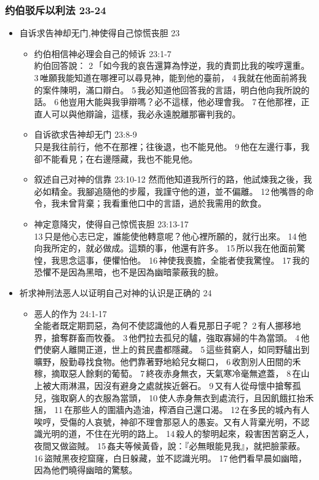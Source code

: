 \subsubsection{约伯驳斥以利法 23-24}
\begin{itemize}
\itemsep-.45em 
\item 自诉求告神却无门,神使得自己惊慌丧胆 23
\begin{itemize}
\itemsep-.45em 
\item 约伯相信神必理会自己的倾诉 23:1-7\\
約伯回答說： 2 「如今我的哀告還算為悖逆，我的責罰比我的唉哼還重。 3 唯願我能知道在哪裡可以尋見神，能到他的臺前， 4 我就在他面前將我的案件陳明，滿口辯白。 5 我必知道他回答我的言語，明白他向我所說的話。 6 他豈用大能與我爭辯嗎？必不這樣，他必理會我。 7 在他那裡，正直人可以與他辯論，這樣，我必永遠脫離那審判我的。
\item 自诉欲求告神却无门 23:8-9\\
只是我往前行，他不在那裡；往後退，也不能見他。 9 他在左邊行事，我卻不能看見；在右邊隱藏，我也不能見他。
\item 叙述自己对神的信靠 23:10-12
然而他知道我所行的路，他試煉我之後，我必如精金。我腳追隨他的步履，我謹守他的道，並不偏離。 12 他嘴唇的命令，我未曾背棄；我看重他口中的言語，過於我需用的飲食。 
\item 神定意降灾，使得自己惊慌丧胆 23:13-17\\
13 只是他心志已定，誰能使他轉意呢？他心裡所願的，就行出來。 14 他向我所定的，就必做成。這類的事，他還有許多。 15 所以我在他面前驚惶，我思念這事，便懼怕他。 16 神使我喪膽，全能者使我驚惶。 17 我的恐懼不是因為黑暗，也不是因為幽暗蒙蔽我的臉。
\end{itemize}
\item 祈求神刑法恶人以证明自己对神的认识是正确的 24
\begin{itemize}
\itemsep-.45em 
\item 恶人的作为 24:1-17\\
全能者既定期罰惡，為何不使認識他的人看見那日子呢？ 2 有人挪移地界，搶奪群畜而牧養。 3 他們拉去孤兒的驢，強取寡婦的牛為當頭。 4 他們使窮人離開正道，世上的貧民盡都隱藏。 5 這些貧窮人，如同野驢出到曠野，殷勤尋找食物。他們靠著野地給兒女糊口， 6 收割別人田間的禾稼，摘取惡人餘剩的葡萄。 7 終夜赤身無衣，天氣寒冷毫無遮蓋， 8 在山上被大雨淋濕，因沒有避身之處就挨近磐石。 9 又有人從母懷中搶奪孤兒，強取窮人的衣服為當頭， 10 使人赤身無衣到處流行，且因飢餓扛抬禾捆， 11 在那些人的圍牆內造油，榨酒自己還口渴。 12 在多民的城內有人唉哼，受傷的人哀號，神卻不理會那惡人的愚妄。又有人背棄光明，不認識光明的道，不住在光明的路上。 14 殺人的黎明起來，殺害困苦窮乏人，夜間又做盜賊。 15 姦夫等候黃昏，說：『必無眼能見我』，就把臉蒙蔽。 16 盜賊黑夜挖窟窿，白日躲藏，並不認識光明。 17 他們看早晨如幽暗，因為他們曉得幽暗的驚駭。

\end{itemize}
\end{itemize}
